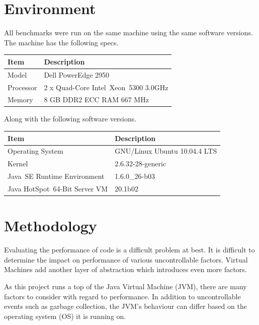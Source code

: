 \documentclass[12pt,letterpaper,oneside]{report}
\theoremstyle{definition}
\begin{document}
		\section{Environment}
			All benchmarks were run on the same machine using the same software versions.  The machine has the following specs.
			
			\begin{table}[!ht]
				\centering
				\begin{tabular}{ll}
					\toprule
					Item & Description \\
					\midrule
					Model & Dell PowerEdge 2950 \\
					Processor & 2 x Quad-Core Intel\textregistered\ Xeon\texttrademark\ 5300 3.0GHz \\
					Memory & 8 GB DDR2 ECC RAM 667 MHz \\
					\bottomrule
				\end{tabular}
			\end{table}
			
			Along with the following software versions.
			
			\begin{table}[!ht]
				\centering
				\begin{tabular}{ll}
					\toprule
					Item & Description \\
					\midrule
					Operating System & GNU/Linux Ubuntu 10.04.4 LTS \\
					Kernel & 2.6.32-28-generic \\
					Java\texttrademark\ SE Runtime Environment & 1.6.0\_26-b03 \\
					Java HotSpot\texttrademark\ 64-Bit Server VM & 20.1\-b02 \\
					\bottomrule
				\end{tabular}
			\end{table}
		
		\section{Methodology}
			Evaluating the performance of code is a difficult problem at best.  It is difficult to determine the impact on performance of various uncontrollable factors.  Virtual Machines add another layer of abstraction which introduces even more factors.
			
			As this project runs a top of the Java Virtual Machine (JVM), there are many factors to consider with regard to performance.  In addition to uncontrollable events such as garbage collection, the JVM's behaviour can differ based on the operating system (OS) it is running on.
			
\end{document}
